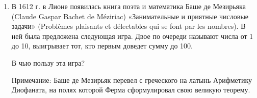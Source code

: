 \documentclass[12pt]{article}
\begin{document}
\begin{enumerate}
   \item В 1612 г. в Лионе появилась книга поэта и математика Баше де Мезирьяка (Claude Gaspar Bachet
   de Méziriac) «Занимательные и приятные числовые задачи» (Problèmes plaisants et délectables qui
   se font par les nombres). В ней была предложена следующая игра. Двое по очереди называют числа
   от 1 до 10, выигрывает тот, кто первым доведет сумму до 100. 
   
   
   В чью пользу эта игра?
   
   Примечание: Баше де Мезирьяк перевел с греческого на латынь Арифметику Диофаната, 
   на полях которой Ферма сформулировал свою великую теорему.   

\end{enumerate}
\end{document}
